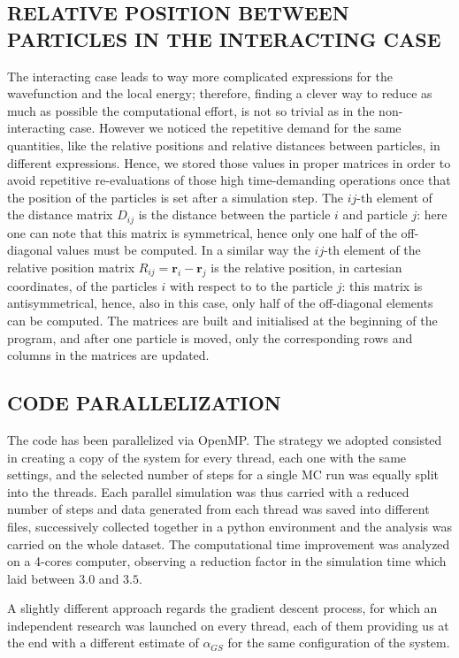 \subsection{RELATIVE POSITION BETWEEN PARTICLES IN THE INTERACTING CASE}
\label{sec:matrix_relative_dist}
The interacting case leads to way more complicated expressions for the wavefunction and the local energy; therefore, finding a clever way to reduce as much as possible the computational effort, is not so trivial as in the non-interacting case. However we noticed the repetitive demand for the same quantities, like the relative positions and relative distances between particles, in different expressions. Hence, we stored those values in proper matrices in order to avoid repetitive re-evaluations of those high time-demanding operations once that the position of the particles is set after a simulation step. The $ij$-th element of the distance matrix $D_{ij}$ is the distance between the particle $i$ and particle $j$: here one can note that this matrix is symmetrical, hence only one half of the off-diagonal values must be computed. In a similar way the $ij$-th element of the relative position matrix $R_{ij} = \bm{r}_i - \bm{r}_j$ is the relative position, in cartesian coordinates, of the particles $i$ with respect to to the particle $j$: this matrix is antisymmetrical, hence, also in this case, only half of the off-diagonal elements can be computed. The matrices are built and initialised at the beginning of the program, and after one particle is moved, only the corresponding rows and columns in the matrices are updated.



    
\subsection{CODE PARALLELIZATION}
The code has been parallelized via OpenMP. The strategy we adopted consisted in creating a copy of the system for every thread, each one with the same settings, and the selected number of steps for a single MC run was  equally split into the threads. Each parallel simulation was thus carried with a reduced number of steps and data generated from each thread was saved into different files, successively collected together in a python environment and the analysis was carried on the whole dataset. The  computational time improvement was analyzed on a 4-cores computer, observing a reduction factor in the simulation time which laid between $3.0$ and $3.5$.

A slightly different approach regards the gradient descent process, for which an independent research was launched on every thread, each of them providing us at the end with a different estimate of $\alpha_{GS}$ for the same configuration of the system. 

